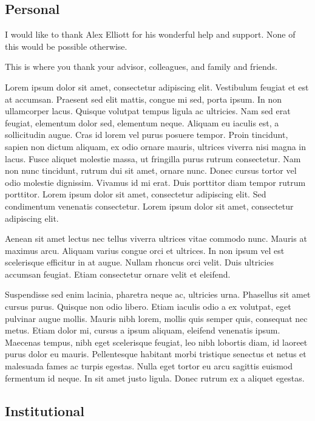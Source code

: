 \subsection*{Personal}

I would like to thank Alex Elliott for his wonderful help and support. None of this would be possible otherwise.

This is where you thank your advisor, colleagues, and family and friends.

Lorem ipsum dolor sit amet, consectetur adipiscing elit. Vestibulum feugiat et est at accumsan. Praesent sed elit mattis, congue mi sed, porta ipsum. In non ullamcorper lacus. Quisque volutpat tempus ligula ac ultricies. Nam sed erat feugiat, elementum dolor sed, elementum neque. Aliquam eu iaculis est, a sollicitudin augue. Cras id lorem vel purus posuere tempor. Proin tincidunt, sapien non dictum aliquam, ex odio ornare mauris, ultrices viverra nisi magna in lacus. Fusce aliquet molestie massa, ut fringilla purus rutrum consectetur. Nam non nunc tincidunt, rutrum dui sit amet, ornare nunc. Donec cursus tortor vel odio molestie dignissim. Vivamus id mi erat. Duis porttitor diam tempor rutrum porttitor. Lorem ipsum dolor sit amet, consectetur adipiscing elit. Sed condimentum venenatis consectetur. Lorem ipsum dolor sit amet, consectetur adipiscing elit.

Aenean sit amet lectus nec tellus viverra ultrices vitae commodo nunc. Mauris at maximus arcu. Aliquam varius congue orci et ultrices. In non ipsum vel est scelerisque efficitur in at augue. Nullam rhoncus orci velit. Duis ultricies accumsan feugiat. Etiam consectetur ornare velit et eleifend.

Suspendisse sed enim lacinia, pharetra neque ac, ultricies urna. Phasellus sit amet cursus purus. Quisque non odio libero. Etiam iaculis odio a ex volutpat, eget pulvinar augue mollis. Mauris nibh lorem, mollis quis semper quis, consequat nec metus. Etiam dolor mi, cursus a ipsum aliquam, eleifend venenatis ipsum. Maecenas tempus, nibh eget scelerisque feugiat, leo nibh lobortis diam, id laoreet purus dolor eu mauris. Pellentesque habitant morbi tristique senectus et netus et malesuada fames ac turpis egestas. Nulla eget tortor eu arcu sagittis euismod fermentum id neque. In sit amet justo ligula. Donec rutrum ex a aliquet egestas.

\subsection*{Institutional}

